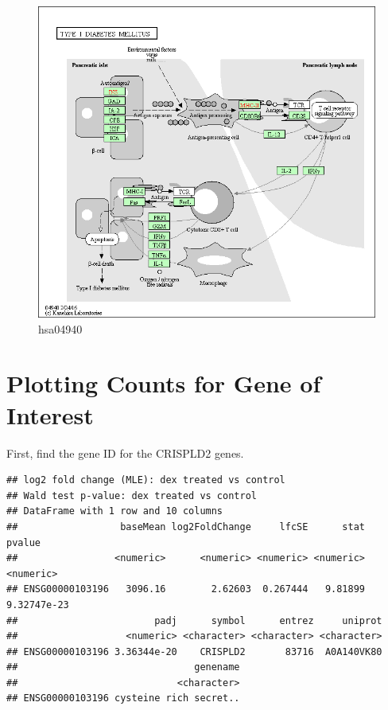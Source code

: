 \documentclass[
]{article}
\newenvironment{Shaded}{\begin{snugshade}}{\end{snugshade}}
\newcommand{\FunctionTok}[1]{\textcolor[rgb]{0.00,0.00,0.00}{#1}}
\newcommand{\NormalTok}[1]{#1}
\newcommand{\OtherTok}[1]{\textcolor[rgb]{0.56,0.35,0.01}{#1}}
\newcommand{\SpecialCharTok}[1]{\textcolor[rgb]{0.00,0.00,0.00}{#1}}
\newcommand{\StringTok}[1]{\textcolor[rgb]{0.31,0.60,0.02}{#1}}
\begin{document}
\begin{figure}
\centering
\includegraphics{hsa04940.png}
\caption{hsa04940}
\end{figure}

\hypertarget{plotting-counts-for-gene-of-interest}{%
\section{Plotting Counts for Gene of
Interest}\label{plotting-counts-for-gene-of-interest}}

First, find the gene ID for the CRISPLD2 genes.

\begin{Shaded}
\end{Shaded}

\begin{verbatim}
## log2 fold change (MLE): dex treated vs control 
## Wald test p-value: dex treated vs control 
## DataFrame with 1 row and 10 columns
##                  baseMean log2FoldChange     lfcSE      stat      pvalue
##                 <numeric>      <numeric> <numeric> <numeric>   <numeric>
## ENSG00000103196   3096.16        2.62603  0.267444   9.81899 9.32747e-23
##                        padj      symbol      entrez     uniprot
##                   <numeric> <character> <character> <character>
## ENSG00000103196 3.36344e-20    CRISPLD2       83716  A0A140VK80
##                               genename
##                            <character>
## ENSG00000103196 cysteine rich secret..
\end{verbatim}
\end{document}
